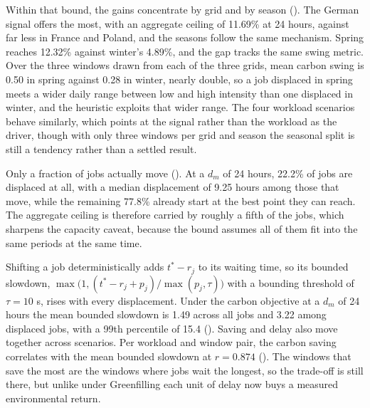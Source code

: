 Within that bound, the gains concentrate by grid and by season (). The German signal offers the most, with an aggregate ceiling of 11.69\% at 24 hours, against far less in France and Poland, and the seasons follow the same mechanism. Spring reaches 12.32\% against winter's 4.89\%, and the gap tracks the same swing metric. Over the three windows drawn from each of the three grids, mean carbon swing is 0.50 in spring against 0.28 in winter, nearly double, so a job displaced in spring meets a wider daily range between low and high intensity than one displaced in winter, and the heuristic exploits that wider range. The four workload scenarios behave similarly, which points at the signal rather than the workload as the driver, though with only three windows per grid and season the seasonal split is still a tendency rather than a settled result.

Only a fraction of jobs actually move (). At a $d_m$ of 24 hours, 22.2\% of jobs are displaced at all, with a median displacement of 9.25 hours among those that move, while the remaining 77.8\% already start at the best point they can reach. The aggregate ceiling is therefore carried by roughly a fifth of the jobs, which sharpens the capacity caveat, because the bound assumes all of them fit into the same periods at the same time.

Shifting a job deterministically adds $t^* - r_j$ to its waiting time, so its bounded slowdown, $\max\bigl(1, (t^* - r_j + p_j) / \max(p_j, \tau)\bigr)$ with a bounding threshold of $\tau = 10$ s, rises with every displacement. Under the carbon objective at a $d_m$ of 24 hours the mean bounded slowdown is 1.49 across all jobs and 3.22 among displaced jobs, with a 99th percentile of 15.4 (). Saving and delay also move together across scenarios. Per workload and window pair, the carbon saving correlates with the mean bounded slowdown at $r = 0.874$ (). The windows that save the most are the windows where jobs wait the longest, so the trade-off is still there, but unlike under Greenfilling each unit of delay now buys a measured environmental return.